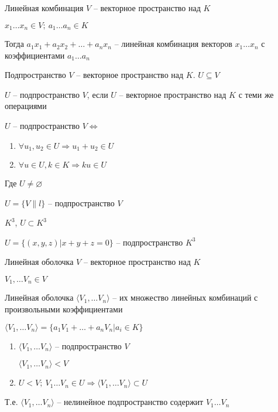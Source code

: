 \documentclass[12pt]{article}
\begin{document}
\begin{defin}{Линейная комбинация}
    $V$ -- векторное пространство над $K$

    $x_1 \ldots x_n \in V;\ a_1 \ldots a_n \in K$

    Тогда $a_1x_1 + a_2x_2 + \ldots + a_nx_n$ -- линейная комбинация векторов $x_1 \ldots x_n$ с коэффициентами $a_1 \ldots a_n$
\end{defin}

\begin{defin}{Подпространство}
    $V$ -- векторное пространство над $K$. $U \subseteq V$ 

    $U$ -- подпространство $V$, если $U$ -- векторное пространство над $K$ с теми же операциями
\end{defin}

\begin{Remark}{}
    $U$ -- подпространство $V \Leftrightarrow$

    \begin{enumerate}
        \item $\forall u_1, u_2 \in U \Rightarrow u_1 + u_2 \in U$
        \item $\forall u \in U, k \in K \Rightarrow ku \in U$
    \end{enumerate}

    Где $U \neq \varnothing$
\end{Remark}

\begin{Example}{}
    $U = \{ V \parallel l \}$ -- подпространство $V$

    $K^3$, $U \subset K^3$

    $U = \{ (x, y, z) | x + y + z = 0 \}$ -- подпространство $K^3$
\end{Example}

\begin{defin}{Линейная оболочка}
    $V$ -- векторное пространство над $K$

    $V_1, \ldots V_n \in V$

    Линейная оболочка $\langle V_1, \ldots V_n \rangle$ -- их множество линейных комбинаций с произвольными коэффициентами

    $\langle V_1, \ldots V_n \rangle = \{ a_1V_1 + \ldots + a_nV_n | a_i \in K \}$
\end{defin}

\begin{Remark}{}
    \begin{enumerate}
        \item $\langle V_1, \ldots V_n \rangle$ -- подпространство $V$
        
        $\langle V_1, \ldots V_n \rangle < V$
    
        \item $U < V;\ V_1 \ldots V_n \in U \Rightarrow \langle V_1, \ldots V_n \rangle \subset U$
    \end{enumerate}
    
    Т.е. $\langle V_1, \ldots V_n \rangle$ -- нелинейное подпространство содержит $V_1 \ldots V_n$
\end{Remark}
\end{document}
